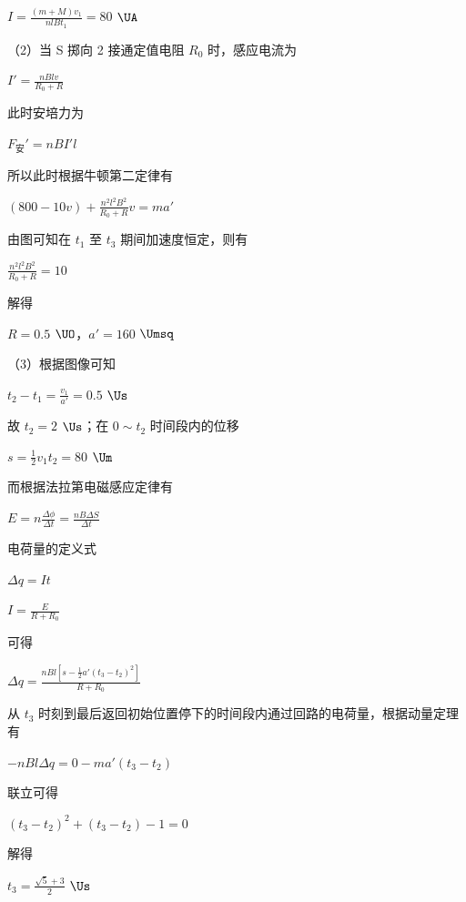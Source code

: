 \documentclass[\gkver]{gaokaozhenti}
\begin{document}
\begin{enumerate}
{	$I=\frac{(m+M)v_{1}}{n l B t_{1}}=80$ $\UA$

	（2）当 S 掷向 2 接通定值电阻 $R_{0}$ 时，感应电流为

	$I'=\frac{nBlv}{R_{0}+R}$

	此时安培力为

	$F_{\text{安}}'=nBI'l$

	所以此时根据牛顿第二定律有

	$(800-10v)+\frac{n^{2}l^{2}B^{2}}{R_{0}+R}v=ma'$

	由图可知在 $t_{1}$ 至 $t_{3}$ 期间加速度恒定，则有

	$\frac{n^{2}l^{2}B^{2}}{R_{0}+R}=10$

	解得

	$R=0.5$ $\UO$，$a'=160$ $\Umsq$

	（3）根据图像可知

	$t_{2}-t_{1}=\frac{v_{1}}{a'}=0.5$ $\Us$

	故 $t_{2}=2$ $\Us$；在 $0\sim t_{2}$ 时间段内的位移

	$s=\frac{1}{2}v_{1}t_{2}=80$ $\Um$

	而根据法拉第电磁感应定律有

	$E=n\frac{\Delta\phi}{\Delta t}=\frac{nB\Delta S}{\Delta t}$

	电荷量的定义式

	$\Delta q = It$

	$I = \frac{E}{R + R_0}$

	可得

	$\Delta q = \frac{nBl\left[s - \frac{1}{2}a'(t_3 - t_2)^2\right]}{R + R_0}$

	从 $t_3$ 时刻到最后返回初始位置停下的时间段内通过回路的电荷量，根据动量定理有

	$-nBl\Delta q = 0 - ma'(t_3 - t_2)$

	联立可得

	$\left(t_3 - t_2\right)^2 + \left(t_3 - t_2\right) - 1 = 0$

	解得

	$t_3 = \frac{\sqrt{5} + 3}{2}$ $\Us$
}


\end{enumerate}
\end{document}
